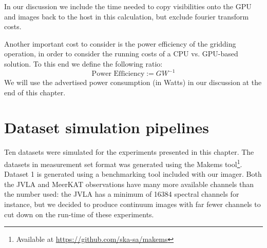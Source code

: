In our discussion we include the time needed to copy visibilities onto the GPU and images back to the host in this calculation, but exclude fourier transform costs.

Another important cost to consider is the power efficiency of the gridding operation, in order to consider the running costs of a CPU vs. GPU-based solution.
To this end we define the following ratio:
\begin{equation}
 \text{Power Efficiency} := GW^{-1}
\end{equation}
We will use the advertised power consumption (in Watts) in our discussion at the end of this chapter.
\section{Dataset simulation pipelines}
Ten datasets were simulated for the experiments presented in this chapter. The datasets in measurement set format was generated using the Makems tool\footnote{Available at
\url{https://github.com/ska-sa/makems}}. Dataset 1 is generated using a benchmarking tool included with our imager. Both the JVLA and MeerKAT observations
have many more available channels than the number used: the JVLA has a minimum of 16384 spectral channels \cite{2041-8205-739-1-L1} for instance, but we decided to produce
continuum images with far fewer channels to cut down on the run-time of these experiments.

